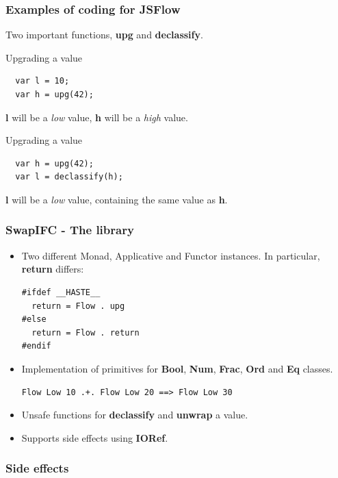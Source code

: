 \documentclass{beamer}
\begin{document}
\begin{frame}[fragile]
  \frametitle{Examples of coding for JSFlow}
  Two important functions, \textbf{upg} and \textbf{declassify}.
  \pause
  \begin{block}{Upgrading a value}
\begin{verbatim}
  var l = 10;
  var h = upg(42);
\end{verbatim}
  \end{block}
  \textbf{l} will be a \emph{low} value, \textbf{h} will be a \emph{high} value.
  \pause
  \begin{block}{Upgrading a value}
\begin{verbatim}
  var h = upg(42);
  var l = declassify(h);
\end{verbatim}
  \end{block}
  \textbf{l} will be a \emph{low} value, containing the same value as \textbf{h}.
\end{frame}


\begin{frame}[fragile]
  \frametitle{SwapIFC - The library}
  \begin{itemize}
  \item Two different Monad, Applicative and Functor instances. \pause In particular, \textbf{return} differs:
\begin{verbatim}
#ifdef __HASTE__
  return = Flow . upg
#else
  return = Flow . return
#endif
\end{verbatim}
\pause
    \item Implementation of primitives for \textbf{Bool}, \textbf{Num}, \textbf{Frac}, \textbf{Ord} and \textbf{Eq} classes. \pause
\begin{verbatim}
Flow Low 10 .+. Flow Low 20 ==> Flow Low 30
\end{verbatim}
\pause
    \item Unsafe functions for \textbf{declassify} and \textbf{unwrap} a value. \pause
    \item Supports side effects using \textbf{IORef}.
  \end{itemize}
\end{frame}


\begin{frame}
  \frametitle{Side effects}
  
\end{frame}
\end{document}
